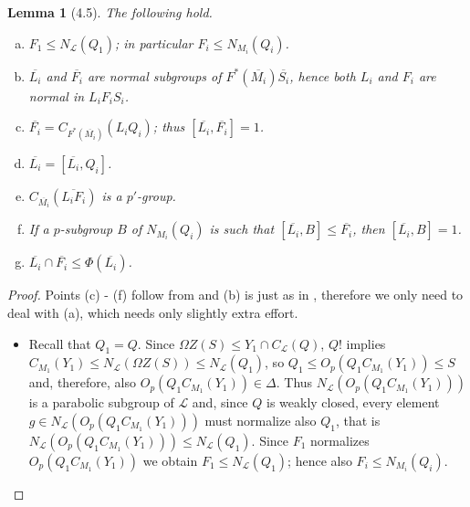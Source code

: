 \documentclass{amsart}
\numberwithin{equation}{section}
\newtheorem{lemma}[equation]{Lemma}
\theoremstyle{definition}
\theoremstyle{subresult}
\theoremstyle{caseresult}
\renewcommand{\L}{\mathcal{L}}
\newcommand{\ov}{\overline}
\newcommand{\norm}{\trianglelefteq}
\newcommand{\<}{\langle}
\renewcommand{\>}{\rangle}
\begin{document}
\begin{lemma}[4.5]\label{lemma4.5}
	The following hold.
	\begin{enumerate}[(a)]
		\item $F_1 \le N_\L(Q_1)$; in particular $F_i \le N_{M_i}(Q_i)$.
		\item $\ov{L_i}$ and $\ov{F_i}$ are normal subgroups of $F^*(\ov{M_i})\ov{S_i}$, hence both $L_i$ and $F_i$ are normal in $L_iF_iS_i$.
		\item $\ov{F_i} = C_{F^*(\ov{M_i})}(L_iQ_i)$; thus $[\ov{L_i},\ov{F_i}]=1$.
		\item $\ov{L_i} = [\ov{L_i},Q_i]$.
		\item $C_{\ov{M_i}}(\ov{L_iF_i})$ is a $p'$-group.
		\item If a $p$-subgroup $B$ of $N_{M_i}(Q_i)$ is such that $[\ov{L_i}, B] \le \ov{F_i}$, then $[\ov{L_i},B]=1$.
		\item $\ov{L_i} \cap \ov{F_i} \le \Phi(\ov{L_i})$.
	\end{enumerate}
\end{lemma}
\begin{proof}
	Points (c) - (f) follow from \cite[Lemma 1.17]{Meier-Stell-Stroth:2012} and (b) is just as in \cite[Lemma 4.5]{Meier-Stell-Stroth:2012}, therefore we only need to deal with (a), which needs only slightly extra effort.
	\begin{itemize}
		\item[(a)] Recall that $Q_1=Q$. Since $\Omega Z(S) \le Y_1 \cap C_\L(Q)$, $Q!$ implies $C_{M_1}(Y_1) \le N_\L(\Omega Z(S)) \le N_\L(Q_1)$, so $Q_1 \le O_p(Q_1C_{M_1}(Y_1)) \le S$ and, therefore, also $O_p(Q_1C_{M_1}(Y_1)) \in \Delta$. Thus $N_\L(O_p(Q_1C_{M_1}(Y_1)))$ is a parabolic subgroup of $\L$ and, since $Q$ is weakly closed, every element $g \in N_\L(O_p(Q_1C_{M_1}(Y_1)))$ must normalize also $Q_1$, that is $N_\L(O_p(Q_1C_{M_1}(Y_1))) \le N_\L(Q_1)$. Since $F_1$ normalizes $O_p(Q_1C_{M_1}(Y_1))$ we obtain $F_1 \le N_\L(Q_1)$; hence also $F_i \le N_{M_i}(Q_i)$.
	\end{itemize}
\end{proof}
\end{document}
